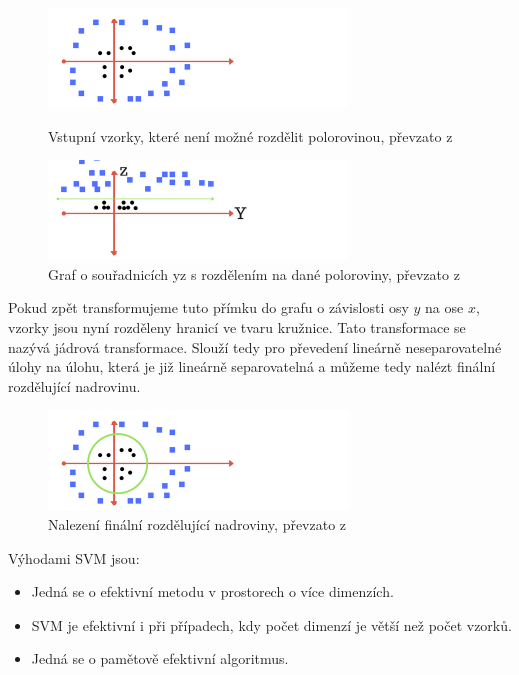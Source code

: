 \begin{figure}[!htbp]
  \begin{minipage}[b]{0.5\linewidth}
  \centering
   \includegraphics[width=300px]{obrazky-figures/mediumsvm1.png}
   \caption{Vstupní vzorky, které není možné rozdělit polorovinou, převzato z \cite{MediumSVM}}
  \end{minipage}
   \hspace{0.5cm}
  \begin{minipage}[b]{0.5\linewidth}
  \centering
   \includegraphics[width=300px]{obrazky-figures/mediumsvm2.png}
  \caption{Graf o souřadnicích yz s rozdělením na dané poloroviny, převzato z \cite{MediumSVM}} 
  \end{minipage}
 \end{figure}

Pokud zpět transformujeme tuto přímku do grafu o závislosti osy $y$ na ose $x$, vzorky jsou nyní rozděleny hranicí ve tvaru kružnice. Tato transformace se nazývá jádrová transformace. Slouží tedy pro převedení lineárně neseparovatelné úlohy na úlohu, která je již lineárně separovatelná a můžeme tedy nalézt finální rozdělující nadrovinu.\cite{MediumSVM}

\begin{figure}[!htbp]
    \centering
    \includegraphics[width=300px]{obrazky-figures/mediumsvm3.png}
    \caption{Nalezení finální rozdělující nadroviny, převzato z \cite{MediumSVM}}
\end{figure}

Výhodami SVM jsou:\cite{ScikitSVM}
\begin{itemize}
    \item Jedná se o efektivní metodu v prostorech o více dimenzích.
    \item SVM je efektivní i při případech, kdy počet dimenzí je větší než počet vzorků.
    \item Jedná se o pamětově efektivní algoritmus.
\end{itemize}

